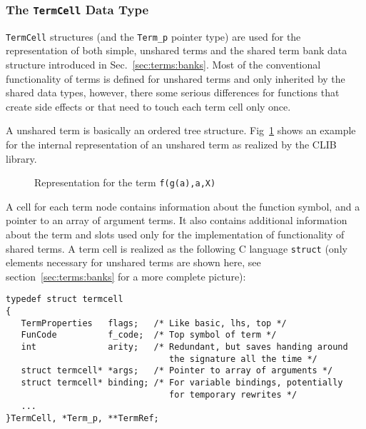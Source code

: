 \subsubsection{The \texttt{TermCell} Data Type}

\texttt{TermCell} structures (and the \texttt{Term\_p} pointer type)
are used for the representation of both simple, unshared terms and the
shared term bank data structure introduced in
Sec.~\ref{sec:terms:banks}.  Most of the conventional functionality
of terms is defined for unshared terms and only inherited by the
shared data types, however, there some serious differences for
functions that create side effects or that need to touch each term
cell only once.

A unshared term is basically an ordered tree structure.
Fig~\ref{fig:terms:unshared} shows an example for the internal
representation of an unshared term as realized by the CLIB library.

\begin{figure}[htb]
  \begin{center}
    \mbox{}
    \caption{Representation for the term \texttt{f(g(a),a,X)}}
    \label{fig:terms:unshared}
  \end{center}
\end{figure}

A cell for each term node contains information about the function
symbol, and a pointer to an array of argument terms. It also contains
additional information about the term and slots used only for the
implementation of functionality of shared terms. A term cell is
realized as the following C language \texttt{struct} (only elements
necessary for unshared terms are shown here, see
section~\ref{sec:terms:banks} for a more complete picture):

\small
\begin{verbatim}
typedef struct termcell
{
   TermProperties   flags;   /* Like basic, lhs, top */
   FunCode          f_code;  /* Top symbol of term */
   int              arity;   /* Redundant, but saves handing around
                                the signature all the time */
   struct termcell* *args;   /* Pointer to array of arguments */
   struct termcell* binding; /* For variable bindings, potentially
                                for temporary rewrites */
   ...
}TermCell, *Term_p, **TermRef;
\end{verbatim}
\normalsize

